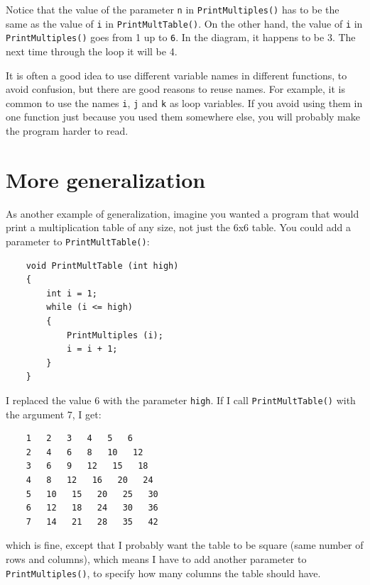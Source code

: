 \vspace{0.1in}
\centerline{}
\vspace{0.1in}
%
Notice that the value of the parameter {\tt n} in
{\tt PrintMultiples()} has to be the same as the value
of {\tt i} in {\tt PrintMultTable()}.  On the other hand,
the value of {\tt i} in {\tt PrintMultiples()} goes
from 1 up to {\tt 6}.  In the diagram, it happens to be 3.
The next time through the loop it will be 4.

It is often a good idea to use different variable names in
different functions, to avoid confusion, but there are good
reasons to reuse names.  For example, it is common to
use the names {\tt i}, {\tt j} and {\tt k} as loop variables.
If you avoid using them in one function just because you
used them somewhere else, you will probably make the program
harder to read.


\section{More generalization}
\label{More generalization}

As another example of generalization, imagine you wanted
a program that would print a multiplication table of any
size, not just the 6x6 table.  You could add a parameter to
{\tt PrintMultTable()}:

\begin{verbatim}
    void PrintMultTable (int high) 
    {
        int i = 1;
        while (i <= high) 
        {
            PrintMultiples (i);
            i = i + 1;
        }
    }
\end{verbatim}
%
I replaced the value 6 with the parameter {\tt high}.  If I
call {\tt PrintMultTable()} with the argument 7, I get:

\begin{verbatim}
    1   2   3   4   5   6   
    2   4   6   8   10   12   
    3   6   9   12   15   18   
    4   8   12   16   20   24   
    5   10   15   20   25   30   
    6   12   18   24   30   36   
    7   14   21   28   35   42   
\end{verbatim}
%
which is fine, except that I probably want the table to
be square (same number of rows and columns), which means
I have to add another parameter to {\tt PrintMultiples()},
to specify how many columns the table should have.

